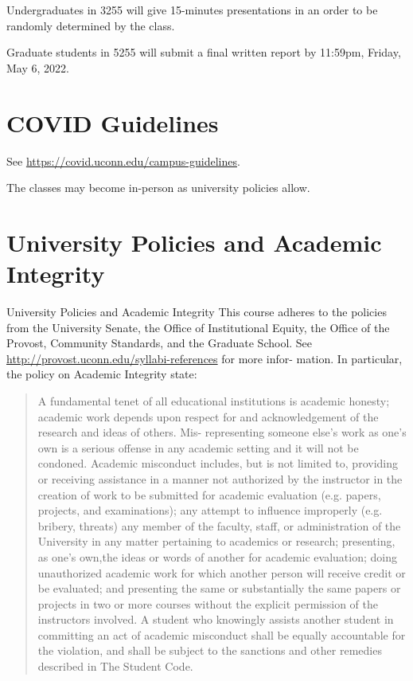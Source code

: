 \documentclass{article}
\begin{document}
\begin{multicols}{2}
\begin{description}
  Undergraduates in 3255 will give 15-minutes presentations in an
  order to be randomly determined by the class.
  
  Graduate students in 5255 will submit a final written report by
  11:59pm, Friday, May 6, 2022.

\end{description}
\end{multicols}

\section*{COVID Guidelines}
  See \url{https://covid.uconn.edu/campus-guidelines}.

  The classes may become in-person as university policies allow.

\section*{University Policies and Academic Integrity}
  University Policies and Academic Integrity
This course adheres to the policies from the University Senate, the
Office of Institutional Equity, the Office of the Provost, Community
Standards, and the Graduate School. See
\url{http://provost.uconn.edu/syllabi-references}
for more infor- mation. In particular, the policy on Academic
Integrity state:
\begin{quote}
A fundamental tenet of all educational institutions is academic
honesty; academic work depends upon respect for and acknowledgement of
the research and ideas of others. Mis- representing someone else’s
work as one’s own is a serious offense in any academic setting and it
will not be condoned. Academic misconduct includes, but is not limited
to, providing or receiving assistance in a manner not authorized by
the instructor in the creation of work to be submitted for academic
evaluation (e.g. papers, projects, and examinations); any attempt to
influence improperly (e.g. bribery, threats) any member of the
faculty, staff, or administration of the University in any matter
pertaining to academics or research; presenting, as one’s own,the
ideas or words of another for academic evaluation; doing
unauthorized academic work for which another person will receive
credit or be evaluated; and presenting the same or substantially the
same papers or projects in two or more courses without the explicit
permission of the instructors involved. A student who knowingly
assists another student in committing an act of academic misconduct
shall be equally accountable for the violation, and shall be subject
to the sanctions and other remedies described in The Student Code.
\end{quote}
\end{document}
